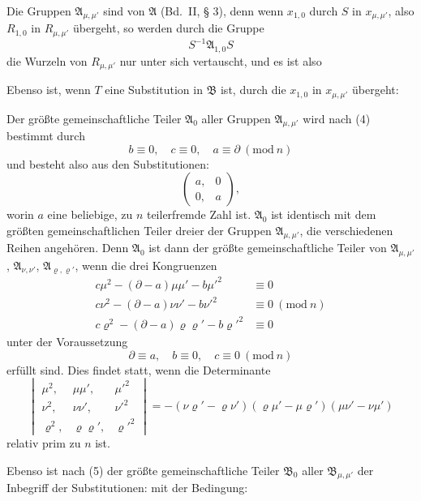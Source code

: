 
Die Gruppen $\mathfrak{A}_{\mu,\mu'}$ sind  von $\mathfrak{A}$
(Bd.\ II, § 3), denn wenn $x_{1,0}$ durch $S$ in $x_{\mu,\mu'}$, also $R_{1,0}$ in $R_{\mu,\mu'}$
übergeht, so werden durch die Gruppe
\[
S^{-1}\mathfrak{A}_{1,0}S
\]
die Wurzeln von $R_{\mu,\mu'}$ nur unter sich vertauscht, und es ist also

Ebenso ist, wenn $T$ eine Substitution in $\mathfrak{B}$ ist, durch die
$x_{1,0}$ in $x_{\mu,\mu'}$ übergeht:

Der größte gemeinschaftliche Teiler $\mathfrak{A}_0$ aller Gruppen $\mathfrak{A}_{\mu,\mu'}$
wird nach (4) bestimmt durch
\[
b \equiv 0, \quad c \equiv 0, \quad a \equiv \partial \ (\mathrm{mod}\ n)
\]
und besteht also aus den Substitutionen:
\[
\begin{pmatrix} a, & 0 \\ 0, & a \end{pmatrix},
\]
worin $a$ eine beliebige, zu $n$ teilerfremde Zahl ist. $\mathfrak{A}_0$ ist identisch
mit dem größten gemeinschaftlichen Teiler dreier der Gruppen $\mathfrak{A}_{\mu,\mu'}$,
die verschiedenen Reihen angehören. Denn $\mathfrak{A}_0$ ist dann
der größte gemeinschaftliche Teiler von $\mathfrak{A}_{\mu,\mu'}$, $\mathfrak{A}_{\nu,\nu'}$, $\mathfrak{A}_{\varrho,\varrho'}$, wenn
die drei Kongruenzen
\[
\begin{aligned}
c\mu^2 - (\partial - a)\mu\mu' - b\mu'^2 &\equiv 0 \\
c\nu^2 - (\partial - a)\nu\nu' - b\nu'^2 &\equiv 0 \ (\mathrm{mod}\ n) \\
c\varrho^2 - (\partial - a)\varrho\varrho' - b\varrho'^2 &\equiv 0
\end{aligned}
\]
 unter der Voraussetzung
\[
\partial \equiv a, \quad b \equiv 0, \quad c \equiv 0 \ (\mathrm{mod}\ n)
\]
erfüllt sind. Dies findet statt, wenn die Determinante
\[
\begin{vmatrix} \mu^2, & \mu\mu', & \mu'^2 \\ \nu^2, & \nu\nu', & \nu'^2 \\ \varrho^2, & \varrho\varrho', & \varrho'^2 \end{vmatrix}
= -(\nu\varrho' - \varrho\nu')(\varrho\mu' - \mu\varrho')(\mu\nu' - \nu\mu')
\]
relativ prim zu $n$ ist.

Ebenso ist nach (5) der größte gemeinschaftliche Teiler $\mathfrak{B}_0$
aller $\mathfrak{B}_{\mu,\mu'}$ der Inbegriff der Substitutionen:
mit der Bedingung:
